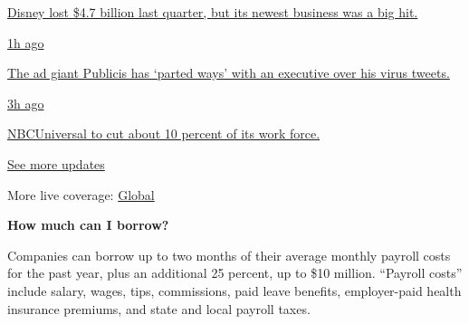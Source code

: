 \href{https://www.nytimes.com/live/2020/08/04/business/stock-market-today-coronavirus?action=click\&pgtype=Article\&state=default\&region=MAIN_CONTENT_1\&context=storylines_live_updates\#disney-lost-4-7-billion-last-quarter-but-its-newest-business-was-a-big-hit}{Disney
lost \$4.7 billion last quarter, but its newest business was a big hit.}

\href{https://www.nytimes.com/live/2020/08/04/business/stock-market-today-coronavirus?action=click\&pgtype=Article\&state=default\&region=MAIN_CONTENT_1\&context=storylines_live_updates\#the-ad-giant-publicis-has-parted-ways-with-an-executive-over-his-virus-tweets}{1h
ago}

\href{https://www.nytimes.com/live/2020/08/04/business/stock-market-today-coronavirus?action=click\&pgtype=Article\&state=default\&region=MAIN_CONTENT_1\&context=storylines_live_updates\#the-ad-giant-publicis-has-parted-ways-with-an-executive-over-his-virus-tweets}{The
ad giant Publicis has `parted ways' with an executive over his virus
tweets.}

\href{https://www.nytimes.com/live/2020/08/04/business/stock-market-today-coronavirus?action=click\&pgtype=Article\&state=default\&region=MAIN_CONTENT_1\&context=storylines_live_updates\#nbcuniversal-to-cut-about-10-percent-of-its-work-force}{3h
ago}

\href{https://www.nytimes.com/live/2020/08/04/business/stock-market-today-coronavirus?action=click\&pgtype=Article\&state=default\&region=MAIN_CONTENT_1\&context=storylines_live_updates\#nbcuniversal-to-cut-about-10-percent-of-its-work-force}{NBCUniversal
to cut about 10 percent of its work force.}

\href{https://www.nytimes.com/live/2020/08/04/business/stock-market-today-coronavirus?action=click\&pgtype=Article\&state=default\&region=MAIN_CONTENT_1\&context=storylines_live_updates}{See
more updates}

More live coverage:
\href{https://www.nytimes.com/2020/08/04/world/coronavirus-cases.html?action=click\&pgtype=Article\&state=default\&region=MAIN_CONTENT_1\&context=storylines_live_updates}{Global}

\textbf{How much can I borrow?}

Companies can borrow up to two months of their average monthly payroll
costs for the past year, plus an additional 25 percent, up to \$10
million. ``Payroll costs'' include salary, wages, tips, commissions,
paid leave benefits, employer-paid health insurance premiums, and state
and local payroll taxes.

